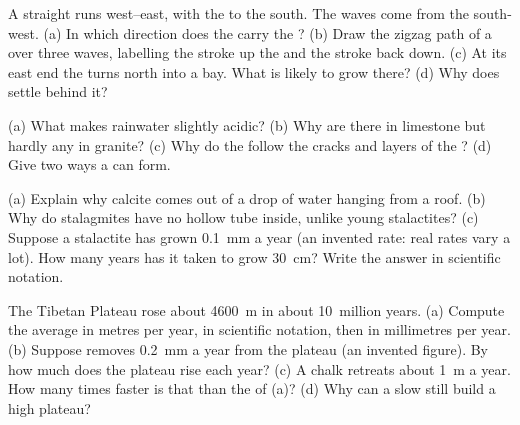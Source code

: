 \begin{exercise}[$\star\star$]\label{exo:g9:landforms:7}
A straight  runs west--east, with the  to the south. The waves
come from the south-west. (a) In which direction does the 
carry the ? (b) Draw the zigzag path of a  over three waves,
labelling the stroke up the  and the stroke back down. (c) At its east
end the  turns north into a bay. What  is likely to grow
there? (d) Why does  settle behind it?
\end{exercise}

\begin{exercise}[$\star\star$]\label{exo:g9:landforms:8}
(a) What makes rainwater slightly acidic? (b) Why are there  in
limestone but hardly any in granite? (c) Why do the  follow the cracks
and layers of the ? (d) Give two ways a  can form.
\end{exercise}

\begin{exercise}[$\star\star$]\label{exo:g9:landforms:9}
(a) Explain why calcite comes out of a drop of water hanging from a 
roof. (b) Why do stalagmites have no hollow tube inside, unlike young
stalactites? (c) Suppose a stalactite has grown \qty{0.1}{mm} a year (an
invented rate: real rates vary a lot). How many years has it taken to grow
\qty{30}{cm}? Write the answer in scientific notation.
\end{exercise}

\begin{exercise}[$\star\star$]\label{exo:g9:landforms:10}
The Tibetan Plateau rose about \qty{4600}{m} in about 10~million years.
(a) Compute the average  in metres per year, in scientific notation,
then in millimetres per year. (b) Suppose  removes \qty{0.2}{mm} a
year from the plateau (an invented figure). By how much does the plateau
rise each year? (c) A chalk  retreats about \qty{1}{m} a year. How many
times faster is that than the  of (a)? (d) Why can a slow 
still build a high plateau?
\end{exercise}

